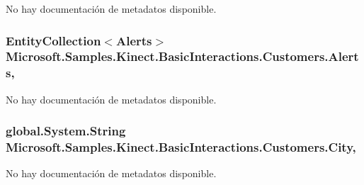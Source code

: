 No hay documentación de metadatos disponible. 

\hypertarget{class_microsoft_1_1_samples_1_1_kinect_1_1_basic_interactions_1_1_customers_a8070a2e1f0901b58f2cd6bb4fb8de838}{
\subsubsection[{Alerts}]{\setlength{\rightskip}{0pt plus 5cm}Entity\-Collection$<${\bf Alerts}$>$ Microsoft.\-Samples.\-Kinect.\-Basic\-Interactions.\-Customers.\-Alerts\hspace{0.3cm}{\ttfamily [get]}, {\ttfamily [set]}}}\label{class_microsoft_1_1_samples_1_1_kinect_1_1_basic_interactions_1_1_customers_a8070a2e1f0901b58f2cd6bb4fb8de838}


No hay documentación de metadatos disponible. 

\hypertarget{class_microsoft_1_1_samples_1_1_kinect_1_1_basic_interactions_1_1_customers_a0cb59a00c3b9b0f786586ab794f794ac}{
\subsubsection[{City}]{\setlength{\rightskip}{0pt plus 5cm}global.\-System.\-String Microsoft.\-Samples.\-Kinect.\-Basic\-Interactions.\-Customers.\-City\hspace{0.3cm}{\ttfamily [get]}, {\ttfamily [set]}}}\label{class_microsoft_1_1_samples_1_1_kinect_1_1_basic_interactions_1_1_customers_a0cb59a00c3b9b0f786586ab794f794ac}


No hay documentación de metadatos disponible. 

